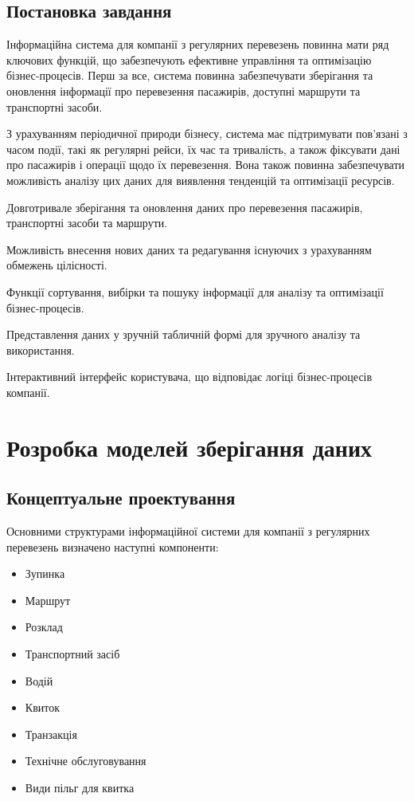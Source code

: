 \documentclass[oneside,14pt]{extarticle}
\begin{document}
\subsection{Постановка завдання}
Інформаційна система для компанії з регулярних перевезень повинна мати ряд ключових функцій, що забезпечують ефективне управління та оптимізацію бізнес-процесів. Перш за все, система повинна забезпечувати зберігання та оновлення інформації про перевезення пасажирів, доступні маршрути та транспортні засоби.

З урахуванням періодичної природи бізнесу, система має підтримувати пов’язані з часом події, такі як регулярні рейси, їх час та тривалість, а також фіксувати дані про пасажирів і операції щодо їх перевезення. Вона також повинна забезпечувати можливість аналізу цих даних для виявлення тенденцій та оптимізації ресурсів.

\begin{list}{•}{Інформаційна система для компанії з регулярних перевезень повинна мати наступні функції:}
    \item Довготривале зберігання та оновлення даних про перевезення пасажирів, транспортні засоби та маршрути.
    \item Можливість внесення нових даних та редагування існуючих з урахуванням обмежень цілісності.
    \item Функції сортування, вибірки та пошуку інформації для аналізу та оптимізації бізнес-процесів.
    \item Представлення даних у зручній табличній формі для зручного аналізу та використання.
    \item Інтерактивний інтерфейс користувача, що відповідає логіці бізнес-процесів компанії.
\end{list}
\newpage

\section{Розробка моделей зберігання даних}
\subsection{Концептуальне проектування}
Основними структурами інформаційної системи для компанії з регулярних перевезень визначено наступні компоненти:
\begin{itemize}
\item Зупинка
\item Маршрут
\item Розклад
\item Транспортний засіб
\item Водій
\item Квиток
\item Транзакція
\item Технічне обслуговування
\item Види пільг для квитка
\end{itemize}
\end{document}
